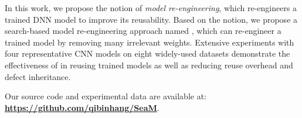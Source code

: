 In this work, we propose the notion of \textit{model re-engineering}, which re-engineers a trained DNN model to improve its reusability.
Based on the notion, we propose a search-based model re-engineering approach named \projectName, which can re-engineer a trained model by removing many irrelevant weights.
Extensive experiments with four representative CNN models on eight widely-used datasets demonstrate the effectiveness of \projectName in reusing trained models as well as reducing reuse overhead and defect inheritance.

Our source code and experimental data are available at: \textbf{\url{https://github.com/qibinhang/SeaM}}.

